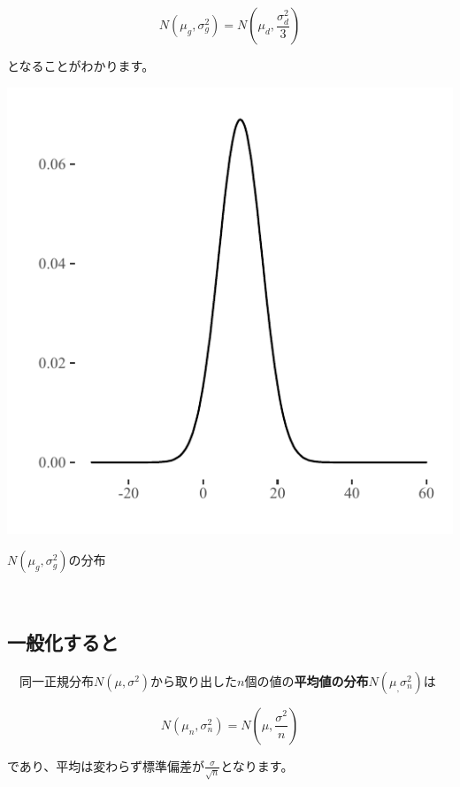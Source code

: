 \documentclass[]{tufte-handout}
\begin{document}
\[N(\mu_g, \sigma^2_g) = N(\mu_d, \frac{\sigma^2_d}{3})\]

となることがわかります。

\begin{marginfigure}

{\centering \includegraphics{AdditivityOfVariance_files/figure-latex/unnamed-chunk-14-1} 

}

\caption[$N(\mu_g, \sigma^2_g)$の分布]{$N(\mu_g, \sigma^2_g)$の分布}\label{fig:unnamed-chunk-14}
\end{marginfigure}

　

\hypertarget{ux4e00ux822cux5316ux3059ux308bux3068}{%
\subsection{\texorpdfstring{\textbf{一般化すると}}{一般化すると}}\label{ux4e00ux822cux5316ux3059ux308bux3068}}

　同一正規分布\(N(\mu, \sigma^2)\)から取り出した\(n\)個の値の\textbf{平均値の分布}\(N(\mu_, \sigma^2_n)\)は

\[N(\mu_n, \sigma^2_n) = N(\mu, \frac{\sigma^2}{n})\]

であり、平均は変わらず標準偏差が\(\frac{\sigma}{\sqrt{n}}\)となります。
\end{document}
